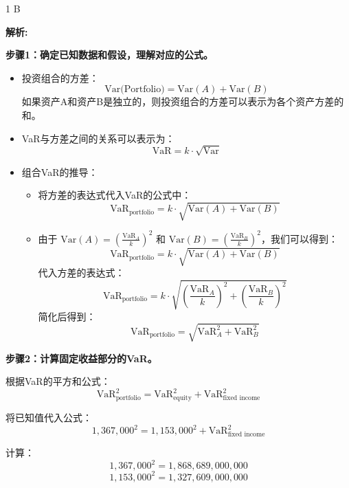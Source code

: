 \documentclass{article}
\newenvironment{explanation}
{\textbf{解析:}\par}
{\par}
\begin{document}
\begin{correctanswer}1
    B
\end{correctanswer}


\begin{explanation}
    \textbf{步骤1：确定已知数据和假设，理解对应的公式。}
    \begin{itemize}
        \item 投资组合的方差：
        \[
        \text{Var(Portfolio)} = \text{Var}(A) + \text{Var}(B)
        \]
        如果资产A和资产B是独立的，则投资组合的方差可以表示为各个资产方差的和。
    
        \item VaR与方差之间的关系可以表示为：
        \[
        \text{VaR} = k \cdot \sqrt{\text{Var}}
        \]
        
        \item 组合VaR的推导：
        \begin{itemize}
            \item 将方差的表达式代入VaR的公式中：
            \[
            \text{VaR}_{\text{portfolio}} = k \cdot \sqrt{\text{Var}(A) + \text{Var}(B)}
            \]
            
            \item 由于 \(\text{Var}(A) = \left(\frac{\text{VaR}_A}{k}\right)^2\) 和 \(\text{Var}(B) = \left(\frac{\text{VaR}_B}{k}\right)^2\)，我们可以得到：
            \[
            \text{VaR}_{\text{portfolio}} = k \cdot \sqrt{\text{Var}(A) + \text{Var}(B)}
            \]
            代入方差的表达式：
            \[
            \text{VaR}_{\text{portfolio}} = k \cdot \sqrt{\left(\frac{\text{VaR}_A}{k}\right)^2 + \left(\frac{\text{VaR}_B}{k}\right)^2}
            \]
            简化后得到：
            \[
            \text{VaR}_{\text{portfolio}} = \sqrt{\text{VaR}^2_A + \text{VaR}^2_B}
            \]
        \end{itemize}
    \end{itemize}


    \textbf{步骤2：计算固定收益部分的VaR。}
    
    根据VaR的平方和公式：
    \[
    \text{VaR}^2_{\text{portfolio}} = \text{VaR}^2_{\text{equity}} + \text{VaR}^2_{\text{fixed income}}
    \]
    
    将已知值代入公式：
    \[
    1,367,000^2 = 1,153,000^2 + \text{VaR}^2_{\text{fixed income}}
    \]

    计算：
    \[
    1,367,000^2 = 1,868,689,000,000
    \]
    \[
    1,153,000^2 = 1,327,609,000,000
    \]
    

\end{explanation}
\end{document}

